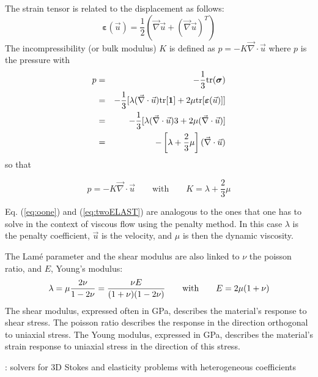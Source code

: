 The strain tensor is related to the displacement as follows: 
\[
{\bm \varepsilon}(\vec{u}) 
= \frac{1}{2}(\vec{\nabla}\vec{u} + (\vec{\nabla}\vec{u})^T)
\]
The incompressibility (or bulk modulus) $K$ is defined as $p=-K \vec{\nabla}\cdot\vec{u}$ 
where $p$ is the pressure with 
\begin{eqnarray}
p&=&-\frac{1}{3} \text{tr}({\bm \sigma}) \nonumber\\
 &=& -\frac{1}{3} [ \lambda (\vec{\nabla}\cdot\vec{u}) \text{tr}[{\bm 1}] + 2 \mu {\rm tr}[{\bm \varepsilon}(\vec{u})]] \nonumber\\
 &=& -\frac{1}{3} [ \lambda (\vec{\nabla}\cdot\vec{u})  3  + 2 \mu  (\vec{\nabla}\cdot\vec{u}) ] \nonumber\\
 &=& -\left[ \lambda + \frac{2}{3} \mu \right] (\vec{\nabla}\cdot\vec{u})  
\end{eqnarray}
so that 
\begin{mdframed}[backgroundcolor=blue!5]
\[
p=-K \vec{\nabla}\cdot\vec{u} 
\qquad
\text{with}
\qquad
K=\lambda+\frac{2}{3}\mu
\]
\end{mdframed}

\begin{remark}
Eq. (\ref{eq:oone}) and (\ref{eq:twoELAST}) are analogous to the ones that one has to solve
in the context of viscous flow using the penalty method. In this case $\lambda$ is the penalty coefficient, 
$\vec{u}$ is the velocity, and $\mu$ is then the dynamic viscosity.
\end{remark}

The Lam\'e parameter and the shear modulus are also linked to $\nu$ the poisson ratio, 
and $E$, Young's modulus:  
\[
\lambda=\mu\frac{2\nu}{1-2\nu}
=\frac{\nu E}{(1+\nu)(1-2\nu)}
\quad\quad
{\rm with}
\quad\quad
E=2\mu(1+\nu)
\]
The shear modulus, expressed often in GPa, describes the material's response to shear stress.
The poisson ratio describes the response in the direction orthogonal to uniaxial stress.
The Young modulus, expressed in GPa, describes the material's strain response to uniaxial stress in the 
direction of this stress.


\Literature: solvers for 3D Stokes and elasticity problems with
heterogeneous coefficients \cite{samb20}















